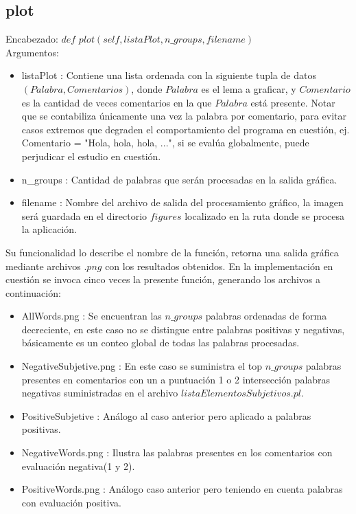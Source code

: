 \documentclass[12pt]{article}
\begin{document}
\subsection{plot} \label{func:plot}
Encabezado: $def$ $plot(self, listaPlot, n\_groups, filename)$ \\
Argumentos:
\begin{itemize}
  \item listaPlot : Contiene una lista ordenada con la siguiente tupla de datos $(Palabra, Comentarios)$, donde $Palabra$ es el lema a graficar, y $Comentario$ es la cantidad de veces comentarios en la que $Palabra$ está presente. Notar que se contabiliza únicamente una vez la palabra por comentario, para evitar casos extremos que degraden el comportamiento del programa en cuestión, ej. Comentario = "Hola, hola, hola, ...", si se evalúa globalmente, puede perjudicar el estudio en cuestión.
  \item n\_groups : Cantidad de palabras que serán procesadas en la salida gráfica.
  \item filename : Nombre del archivo de salida del procesamiento gráfico, la imagen será guardada en el directorio $figures$ localizado en la ruta donde se procesa la aplicación.
\end{itemize}

Su funcionalidad lo describe el nombre de la función, retorna una salida gráfica mediante archivos $.png$ con los resultados obtenidos.
En la implementación en cuestión se invoca cinco veces la presente función, generando los archivos a continuación:
\begin{itemize}
  \item AllWords.png : Se encuentran las $n\_groups$ palabras ordenadas de forma decreciente, en este caso no se distingue entre palabras positivas y negativas, básicamente es un conteo global de todas las palabras procesadas.
  \item NegativeSubjetive.png : En este caso se suministra el top $n\_groups$ palabras presentes en comentarios con un a puntuación 1 o 2 intersección palabras negativas suministradas en el archivo $listaElementosSubjetivos.pl$.
  \item PositiveSubjetive : Análogo al caso anterior pero aplicado a palabras positivas.
  \item NegativeWords.png : Ilustra las palabras presentes en los comentarios con evaluación negativa(1 y 2).
  \item PositiveWords.png : Análogo caso anterior pero teniendo en cuenta palabras con evaluación positiva.
\end{itemize}
\end{document}
